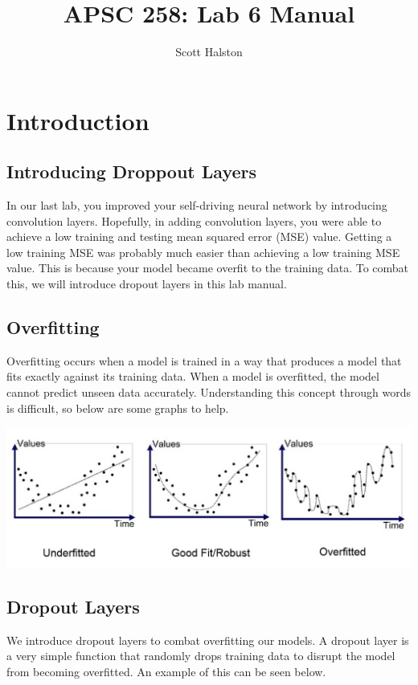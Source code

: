 \documentclass[11pt]{report}
\title{APSC 258: Lab 6 Manual}
\author{Scott Halston}
\begin{document}
\maketitle
\tableofcontents

\clearpage

\chapter{Introduction}
\section{Introducing Droppout Layers}
In our last lab, you improved your self-driving neural network by introducing convolution layers. Hopefully, in adding convolution layers, you were able to achieve a low training and testing mean squared error (MSE) value. Getting a low training MSE was probably much easier than achieving a low training MSE value. This is because your model became overfit to the training data. To combat this, we will introduce dropout layers in this lab manual.

\section{Overfitting}
Overfitting occurs when a model is trained in a way that produces a model that fits exactly against its training data. When a model is overfitted, the model cannot predict unseen data accurately. Understanding this concept through words is difficult, so below are some graphs to help.

\begin{center}
    \includegraphics[scale=0.375]{./images/overfitexample.png}
\end{center}

\section{Dropout Layers}
We introduce dropout layers to combat overfitting our models. A dropout layer is a very simple function that randomly drops training data to disrupt the model from becoming overfitted. An example of this can be seen below.
\end{document}
